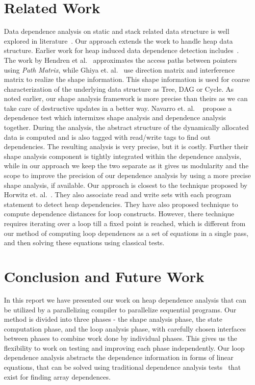 \documentclass{IOS-Book-Article}
\begin{document}
\section{Related Work}
Data dependence analysis on static and stack related data
structure is well explored in
literature~\cite{Allen87automatic, Wolf91loop,
  Banerjee93automatic, Kennedy01Optimizing}. Our approach
extends the work to handle heap data structure.  Earlier work
for heap induced data dependence detection
includes~\cite{horwitz89dependence,Hendren90parallel,
  ghiya98detecting, navarro05dependence}.  The work by
Hendren et al.~\cite{Hendren90parallel} approximates the
access paths between pointers using {\em Path Matrix}, while
Ghiya et. al.~\cite{ghiya98detecting} use direction matrix
and interference matrix to realize the shape
information. This shape information is used for coarse
characterization of the underlying data structure as Tree,
DAG or Cycle. As noted earlier, our shape analysis framework
is more precise than theirs as we can take care of
destructive updates in a better way.  Navarro et. al.
~\cite{navarro05dependence} propose a dependence test which
intermixes shape analysis and dependence analysis
together. During the analysis, the abstract structure of the
dynamically allocated data is computed and is also tagged
with read/write tags to find out dependencies. The resulting
analysis is very precise, but it is costly. Further their
shape analysis component is tightly integrated within the
dependence analysis, while in our approach we keep the
  two separate as it gives us modularity and the scope to
  improve the precision of our dependence analysis by using a
  more precise shape analysis, if available.  Our approach
is closest to the technique proposed by Horwitz
et. al.~\cite{horwitz89dependence}. They also associate read
and write sets with each program statement to detect heap
dependencies. They have also proposed technique to compute
dependence distances for loop constructs. However, there
technique requires iterating over a loop till a fixed point
is reached, which is different from our method of computing
loop dependences as a set of equations in a single pass, and
then solving these equations using classical tests.

\section{Conclusion and Future Work}

In this report we have presented our work on heap dependence
analysis that can be utilized by a parallelizing compiler to
parallelize sequential programs. Our method is divided into
three phases - the shape analysis phase, the state
computation phase, and the loop analysis phase, with
carefully chosen interfaces between phases to combine work
done by individual phases. This gives us the flexibility to
work on testing and improving each phase independently.  Our
loop dependence analysis abstracts the dependence information
in forms of linear equations, that can be solved using
traditional dependence analysis
tests~\cite{Allen87automatic,Wolf91loop,Banerjee93automatic}
that exist for finding array dependences.
\end{document}

